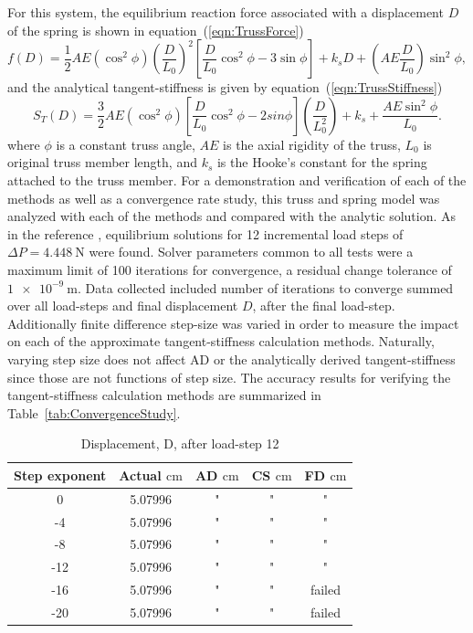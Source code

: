 \documentclass[preprint,12pt]{elsarticle}
\begin{document}
%
For this system, the equilibrium reaction force associated with a displacement $D$ of the spring is shown in equation~(\ref{eqn:TrussForce}) 
%
\begin{equation} 
    \label{eqn:TrussForce}
    f(D) = \frac 1 2 AE(\cos^{2}\phi)(\frac{D}{L_{0}})^{2}[\frac{D}{L_{0}}\cos^{2}\phi - 3\sin\phi] + k_{s}D + (AE\frac{D}{L_{0}})\sin^{2}\phi,
\end{equation} 
%
and the analytical tangent-stiffness is given by equation~(\ref{eqn:TrussStiffness})
%
\begin{equation} 
    \label{eqn:TrussStiffness}
    S_{T}(D) = \frac 3 2 AE(\cos^{2}\phi)[\frac{D}{L_{0}}\cos^{2}\phi - 2sin\phi](\frac{D}{L_{0}^{2}}) + k_{s} + \frac{AE\sin^{2}\phi}{L_{0}}.
\end{equation}
%
where $\phi$ is a constant truss angle, $AE$ is the axial rigidity of the truss, $L_{0}$ is original truss member length, and $k_{s}$ is the Hooke's constant for the spring attached to the truss member. For a demonstration and verification of each of the methods as well as a convergence rate study, this truss and spring model was analyzed with each of the methods and compared with the analytic solution. As in the reference \cite{rezaiee2010dynamic}, equilibrium solutions for 12 incremental load steps of $\Delta P=\SI{4.448}{\newton}$ were found. Solver parameters common to all tests were a maximum limit of 100 iterations for convergence, a residual change tolerance of $\SI{1e-9}{\meter}$.  Data collected included number of iterations to converge summed over all load-steps and final displacement $D$, after the final load-step. Additionally finite difference step-size was varied in order to measure the impact on each of the approximate tangent-stiffness calculation methods. Naturally, varying step size does not affect AD or the analytically derived tangent-stiffness since those are not functions of step size. The accuracy results for verifying the tangent-stiffness calculation methods are summarized in Table~\ref{tab:ConvergenceStudy}. 
%
\begin{table}[tbp]    
  \centering
        \caption{Displacement, D, after load-step 12} \label{tab:Verification}   
        \begin{tabular}{c c c c c}
         \toprule
         Step exponent & Actual $\si{\centi\meter}$ & AD $\si{\centi\meter}$ & CS $\si{\centi\meter}$ & FD $\si{\centi\meter}$\\ 
        \midrule
        0 & 5.07996 & " & " & "\\
        -4 & 5.07996 & " & " & "\\
        -8 & 5.07996 & " & " & "\\
        -12 & 5.07996 & " & " & " \\
        -16 & 5.07996 & " & " & failed \\
        -20 & 5.07996 & " & " & failed \\
        \bottomrule
    \end{tabular}
\end{table}
\end{document}
